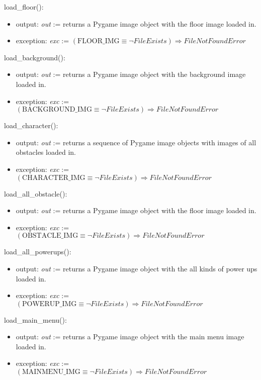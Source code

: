 \documentclass[12pt]{article}
\begin{document}
load\_floor():
\begin{itemize}
    \item output: \textit{out} := returns a Pygame image object with the floor image loaded in.
    \item exception: \textit{exc} := $(\text{FLOOR\_IMG} \equiv \neg FileExists) \Rightarrow FileNotFoundError$
\end{itemize}

\noindent load\_background():
\begin{itemize}
    \item output: \textit{out} := returns a Pygame image object with the background image loaded in.
    \item exception: \textit{exc} := $(\text{BACKGROUND\_IMG} \equiv \neg FileExists) \Rightarrow FileNotFoundError$
\end{itemize}

load\_character():
\begin{itemize}
    \item output: \textit{out} := returns a sequence of Pygame image objects with images of all obstacles loaded in.
    \item exception: \textit{exc} := $(\text{CHARACTER\_IMG} \equiv \neg FileExists) \Rightarrow FileNotFoundError$
\end{itemize}

load\_all\_obstacle():
\begin{itemize}
    \item output: \textit{out} := returns a Pygame image object with the floor image loaded in.
    \item exception: \textit{exc} := $(\text{OBSTACLE\_IMG} \equiv \neg FileExists) \Rightarrow FileNotFoundError$
\end{itemize}

load\_all\_powerups():
\begin{itemize}
    \item output: \textit{out} := returns a Pygame image object with the all kinds of power ups loaded in.
    \item exception: \textit{exc} := $(\text{POWERUP\_IMG} \equiv \neg FileExists) \Rightarrow FileNotFoundError$
\end{itemize}

load\_main\_menu():
\begin{itemize}
    \item output: \textit{out} := returns a Pygame image object with the main menu image loaded in.
    \item exception: \textit{exc} := $(\text{MAINMENU\_IMG} \equiv \neg FileExists) \Rightarrow FileNotFoundError$
\end{itemize}
\end{document}
